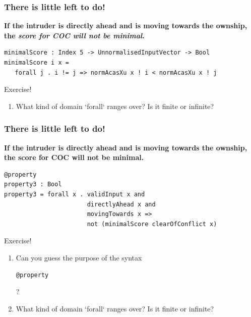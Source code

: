 \documentclass[aspectratio=169]{beamer}
\begin{document}
\begin{frame}[fragile]
\frametitle{There is little left to do!}

\footnotesize{
\textbf{If the intruder is directly ahead and is moving towards the
 ownship, the \emph{score for COC will not be minimal}.}}

\pause

\begin{verbatim}
minimalScore : Index 5 -> UnnormalisedInputVector -> Bool
minimalScore i x = 
   forall j . i != j => normAcasXu x ! i < normAcasXu x ! j
\end{verbatim}
\pause
\begin{block}{Exercise!}
\footnotesize{
\begin{enumerate}
\item What kind of domain  `forall` ranges over? Is it finite or infinite?
\end{enumerate}}
\end{block}

\end{frame}


\begin{frame}[fragile]
\frametitle{There is little left to do!}

\footnotesize{
\textbf{If the intruder is directly ahead and is moving towards the
 ownship, the score for COC will not be minimal.}}

\pause

\begin{verbatim}
@property
property3 : Bool
property3 = forall x . validInput x and 
                       directlyAhead x and 
                       movingTowards x =>
                       not (minimalScore clearOfConflict x)
\end{verbatim}
\pause
\begin{block}{Exercise!}
\footnotesize{
\begin{enumerate}
\item Can you guess the purpose of the syntax
\begin{verbatim}
@property
\end{verbatim}
?
\item What kind of domain  `forall` ranges over? Is it finite or infinite?
\end{enumerate}}
\end{block}

\end{frame}
\end{document}
